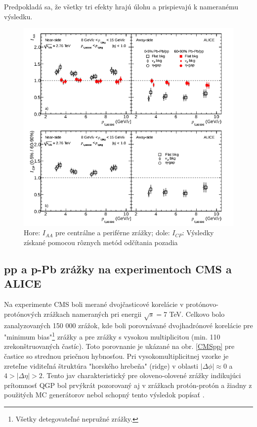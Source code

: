 \documentclass[thesismargins, thesislinespacing]{rnthesis}
\begin{document}
Predpokladá sa, že všetky tri efekty hrajú úlohu a prispievajú k nameranému výsledku.

\begin{figure}[hbtp!]
	\centering
	\includegraphics[scale=0.9]{./Obrazky_praca/clanok2.png}
	\caption{ Hore: $I_{AA}$ pre centrálne a periférne zrážky; dole: $I_{CP}$: Výsledky získané pomocou rôznych metód odčítania pozadia~\cite{clanok}}
	\label{clanok2}
\end{figure}

\subsection{pp a p-Pb zrážky na experimentoch CMS a ALICE}
\label{textAliceCms}
Na experimente CMS boli merané dvojčasticové korelácie v protónovo-protónových zrážkach nameraných pri energii $\sqrt{s}=$7 TeV. Celkovo bolo zanalyzovaných 150 000 zrážok, kde boli porovnávané dvojhadrónové korelácie pre "minimum bias"\footnote{Všetky detegovateľné nepružné zrážky.} zrážky a pre zrážky s vysokou multiplicitou (min. 110 zrekonštruovaných častíc). Toto porovnanie je ukázané na obr. \ref{CMSpp} pre častice so strednou priečnou hybnosťou. Pri vysokomultiplicitnej vzorke je zreteľne viditeľná štruktúra "horského hrebeňa" (ridge) v oblasti $|\Delta \phi|\approx0$ a $4>|\Delta \eta|>2$. Tento jav charakteristický pre oloveno-olovené zrážky indikujúci prítomnosť QGP bol prvýkrát pozorovaný aj v zrážkach protón-protón a žiadny z použitých MC generátorov nebol schopný tento výsledok popísať \cite{CMSpp}. 
\end{document}
